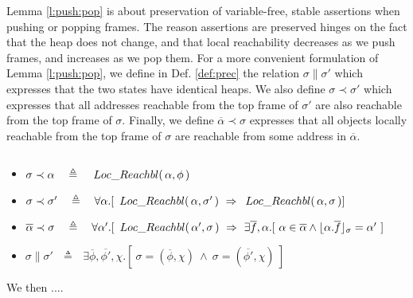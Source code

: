 {\begin{lemma}
\end{lemma}

Lemma \ref{l:push:pop} is  about preservation of variable-free, stable assertions when pushing or popping frames. 
The reason assertions are preserved hinges on the fact that the heap does not change, and that  local reachability decreases as we push frames, and increases as we pop them.
 For a more convenient formulation of Lemma \ref{l:push:pop}, we define in Def. \ref{def:prec} the relation  $\sigma \parallel \sigma' $ which expresses that the two states have identical heaps. 
 We also define 
 $\sigma \prec \sigma'$ which expresses that all addresses reachable from the top frame of $\sigma'$ are also reachable from the top frame of $\sigma$. 
Finally, we define  $\overline \alpha \prec \sigma$ expresses that all objects locally reachable from the top frame of $\sigma$ are reachable from some address in $\overline \alpha$.
 
 
 
\begin{definition}
$~ $ %
\label{def:prec}
\begin{itemize}
\item
$\sigma \prec \alpha\ \ \ \triangleq\ \ \ \LRelevant {\alpha} {\phi}$
\item
$\sigma \prec \sigma'\ \ \ \triangleq\ \ \  \forall \alpha.[\ \LRelevant {\alpha} {\sigma'} \ \Rightarrow \  \LRelevant {\alpha} {\sigma}] $
\item
$\overline \alpha \prec \sigma \ \ \ \triangleq\ \ \  \forall \alpha'.[\ \LRelevant {\alpha'} {\sigma} \ \Rightarrow \  \exists \overline f, \alpha. [\ \alpha \in \overline \alpha \wedge 
\interpret \sigma {\alpha.{\overline f}} = \alpha' \ ]$
\item
$\sigma \parallel \sigma'  \ \ \ \triangleq\ \ \ \exists \overline \phi,  \overline {\phi'}, \chi. [\ \sigma=( \overline \phi, \chi )\ \wedge\ 
\sigma=( \overline {\phi'}, \chi )\ ]$
\end{itemize}
\end{definition}

We then ....

}
